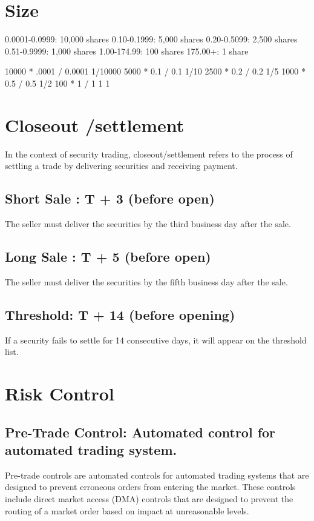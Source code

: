 \documentclass[11pt]{article}
\begin{document}
\section{Size}
\label{sec:org93b7697}
0.0001-0.0999: 10,000 shares
0.10-0.1999: 5,000 shares
0.20-0.5099: 2,500 shares
0.51-0.9999: 1,000 shares
1.00-174.99: 100 shares
175.00+: 1 share

10000 * .0001 / 0.0001  1/10000
5000  * 0.1   / 0.1     1/10
2500  * 0.2   / 0.2     1/5
1000  * 0.5   / 0.5     1/2
100   * 1     / 1       1
1




\section{Closeout /settlement}
\label{sec:org07ae9ca}
In the context of security trading, closeout/settlement refers to the process of settling a trade by delivering securities and receiving payment. 
\subsection{Short Sale : T + 3  (before open)}
\label{sec:org5fbfa5a}
The seller must deliver the securities by the third business day after the sale.
\subsection{Long Sale  : T + 5  (before open)}
\label{sec:org23cd2c3}
The seller must deliver the securities by the fifth business day after the sale.
\subsection{Threshold: T + 14 (before opening)}
\label{sec:orgb54ae8b}
If a security fails to settle for 14 consecutive days, it will appear on the threshold list.

\section{Risk Control}
\label{sec:org9d62909}
\subsection{Pre-Trade Control: Automated control for automated trading system.}
\label{sec:org0423adf}
Pre-trade controls are automated controls for automated trading systems that are designed to prevent erroneous orders from entering the market.
These controls include direct market access (DMA) controls that are designed to prevent the routing of a market order based on impact at unreasonable levels. 
\end{document}
